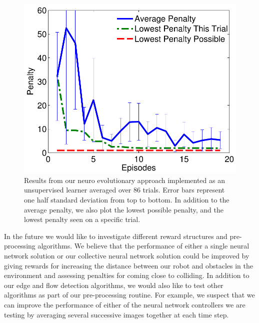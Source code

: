\documentclass{article}
\begin{document}
		\begin{figure} [t]
			\vspace{-6pt}
			\begin{center}
				\includegraphics[width=\columnwidth]{unsupervised_results.pdf}
			\end{center}
			\vspace{-6pt}
			\caption{Results from our neuro evolutionary approach implemented as an unsupervised learner averaged over 86 trials.  Error bars represent one half standard deviation from top to bottom.  In addition to the average penalty, we also plot the lowest possible penalty, and the lowest penalty seen on a specific trial.}
			\vspace{-6pt}
			\label{fig:unsupervised_results}
		\end{figure}

		In the future we would like to investigate different reward structures and pre-processing algorithms.  We believe that the performance of either a single neural network solution or our collective neural network solution could be improved by giving rewards for increasing the distance between our robot and obstacles in the environment and assessing penalties for coming close to colliding.  In addition to our edge and flow detection algorithms, we would also like to test other algorithms as part of our pre-processing routine.  For example, we suspect that we can improve the performance of either of the neural network controllers we are testing by averaging several successive images together at each time step.
\end{document}
